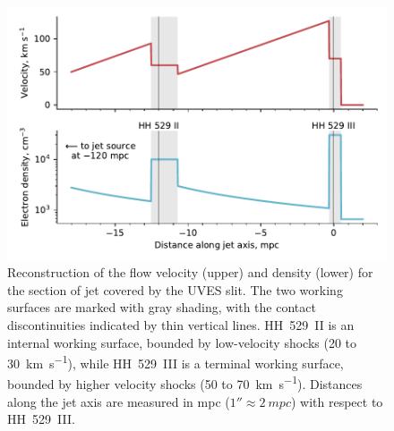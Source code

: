 \documentclass[useAMS, usenatbib]{mnras}
\begin{document}
\begin{figure}
  \centering
  \includegraphics[width=\linewidth]{hh529-ii-iii-ws-profiles}
  \caption{
    Reconstruction of the flow velocity (upper)
    and density (lower)
    for the section of jet covered by the UVES slit.
    The two working surfaces are marked with gray shading,
    with the contact discontinuities indicated by thin vertical lines.
    HH~529~II is an internal working surface, bounded by low-velocity shocks (\num{20} to \SI{30}{km.s^{-1}}),
    while HH~529~III is a terminal working surface, bounded by higher velocity shocks (\num{50} to \SI{70}{km.s^{-1}}).
    Distances along the jet axis are measured in mpc (\(1'' \approx \SI{2}{mpc}\))
    with respect to HH~529~III.
  }
  \label{fig:ws-profiles}
\end{figure}
\end{document}

